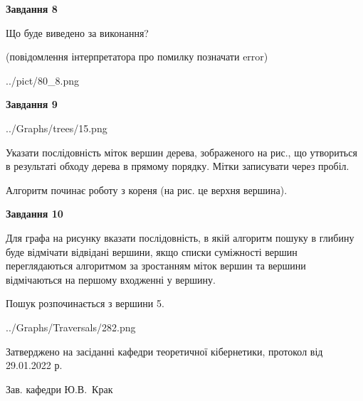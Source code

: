 \documentclass[12pt, ukrainian]{article}
\begin{document}
{\begin {large}
{\begin {center}\textbf{Завдання 8}\end {center}}\par
Що буде виведено за виконання?\par
 (повідомлення інтерпретатора про помилку позначати error)\par
\begin{center}
	{../pict/80_8.png}
\end{center}
\newpage

{\begin {center}\textbf{Завдання 9}\end {center}}\par

\begin{center}
	{../Graphs/trees/15.png}
\end{center}
Указати послідовність міток вершин дерева, зображеного на рис., що утвориться в результаті обходу дерева в прямому порядку. Мітки записувати через пробіл.\par Алгоритм починає роботу з кореня (на рис. це верхня вершина).\par
\newpage

{\begin {center}\textbf{Завдання 10}\end {center}}\par
Для графа на рисунку вказати послідовність, в якій алгоритм пошуку в глибину буде відмічати відвідані вершини, якщо списки суміжності вершин переглядаються алгоритмом за зростанням міток вершин та вершини відмічаються на першому вход\-женні у вершину.\par
Пошук розпочинається з вершини 5.\par

\begin{center}
	{../Graphs/Traversals/282.png}
\end{center}\par
\newpage


\end {large}
}
{\smallskip \begin {small} Затверджено на засіданні кафедри теоретичної кібернетики, протокол  від   29.01.2022 р.\par\smallskip\smallskip
{\parbox {6.5 cm}{Зав. кафедри \dotfill Ю.В.~Крак}} \end{small}}
\end{document}
